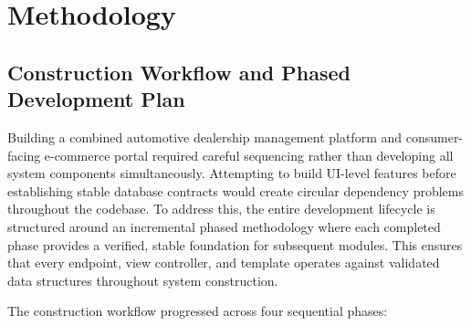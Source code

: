 \chapter{Methodology}

\section{Construction Workflow and Phased Development Plan}

Building a combined automotive dealership management platform and consumer-facing e-commerce portal required careful sequencing rather than developing all system components simultaneously. Attempting to build UI-level features before establishing stable database contracts would create circular dependency problems throughout the codebase. To address this, the entire development lifecycle is structured around an incremental phased methodology where each completed phase provides a verified, stable foundation for subsequent modules. This ensures that every endpoint, view controller, and template operates against validated data structures throughout system construction.

The construction workflow progressed across four sequential phases:

